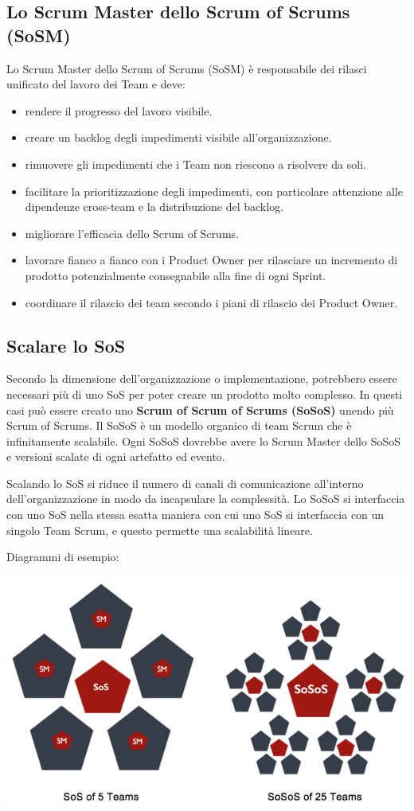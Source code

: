 \documentclass[12pt,a4paper,parskip=full]{scrartcl}
\begin{document}
\subsection{Lo Scrum Master dello Scrum of Scrums (SoSM)}
Lo Scrum Master dello Scrum of Scrums (SoSM) è responsabile dei rilasci unificato del lavoro dei Team e deve:
\begin{itemize}
\item rendere il progresso del lavoro visibile.
\item creare un backlog degli impedimenti visibile all'organizzazione.
\item rimuovere gli impedimenti che i Team non riescono a risolvere da soli. 
\item facilitare la prioritizzazione degli impedimenti, con particolare attenzione alle dipendenze cross-team e la distribuzione del backlog. 
\item migliorare l'efficacia dello Scrum of Scrums.
\item lavorare fianco a fianco con i Product Owner per rilasciare un incremento di prodotto potenzialmente consegnabile alla fine di ogni Sprint.
\item coordinare il rilascio dei team secondo i piani di rilascio dei Product Owner.
\end{itemize}

\subsection{Scalare lo SoS}
Secondo la dimensione dell'organizzazione o implementazione, potrebbero essere necessari più di uno SoS per poter creare un prodotto molto complesso. In questi casi può essere creato uno \textbf{Scrum of Scrum of Scrums (SoSoS)} unendo più Scrum of Scrums. Il SoSoS è un modello organico di team Scrum che è infinitamente scalabile. Ogni SoSoS dovrebbe avere lo Scrum Master dello SoSoS e versioni scalate di ogni artefatto ed evento.

Scalando lo SoS si riduce il numero di canali di comunicazione all'interno dell'organizzazione in modo da incapsulare la complessità. Lo SoSoS si interfaccia con uno SoS nella stessa esatta maniera con cui uno SoS si interfaccia con un singolo Team Scrum, e questo permette una scalabilità lineare.

\pagebreak
Diagrammi di esempio:

\includegraphics[width=1.0\linewidth]{Sos-R2.png}
\end{document}
